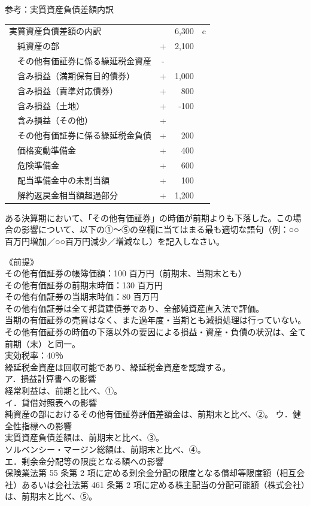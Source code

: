 \documentclass[report,gutter=10mm,fore-edge=10mm,uplatex,dvipdfmx]{jlreq}
\begin{document}
参考：実質資産負債差額内訳

\begin{tabular}{|l|lc|r|l}
\cline{1-4}
 \multicolumn{3}{|l|}{実質資産負債差額の内訳}& 6,300&c \\ \cline{2-4}
& 純資産の部 &+ & 2,100&\\ \cline{2-4}
& その他有価証券に係る繰延税金資産 &- & &\\ \cline{2-4}
&  含み損益（満期保有目的債券）&+ & 1,000&\\ \cline{2-4}
&  含み損益（責準対応債券）&+ & 800&\\ \cline{2-4}
&  含み損益（土地）&+ & -100&\\ \cline{2-4}
&  含み損益（その他）&+ & &\\ \cline{2-4}
& その他有価証券に係る繰延税金負債 &+ &200 &\\ \cline{2-4}
&価格変動準備金 &+ &400 &\\ \cline{2-4}
& 危険準備金 &+ &600 &\\ \cline{2-4}
& 配当準備金中の未割当額 &+ &100 &\\ \cline{2-4}
&解約返戻金相当額超過部分 &+ &1,200 &\\ \cline{2-4}
\end{tabular}

ある決算期において、「その他有価証券」の時価が前期よりも下落した。この場合の影響について、以下の①～⑤の空欄に当てはまる最も適切な語句（例：○○百万円増加／○○百万円減少／増減なし）を記入しなさい。

《前提》\\
その他有価証券の帳簿価額：100 百万円（前期末、当期末とも）\\
その他有価証券の前期末時価：130 百万円\\
その他有価証券の当期末時価：80 百万円\\
その他有価証券は全て邦貨建債券であり、全部純資産直入法で評価。\\
当期の有価証券の売買はなく、また過年度・当期とも減損処理は行っていない。\\
その他有価証券の時価の下落以外の要因による損益・資産・負債の状況は、全て前期（末）と同一。\\
実効税率：40％\\
繰延税金資産は回収可能であり、繰延税金資産を認識する。\\

ア．損益計算書への影響\\
経常利益は、前期と比べ、①。\\
イ．貸借対照表への影響\\
純資産の部におけるその他有価証券評価差額金は、前期末と比べ、②。
ウ．健全性指標への影響\\
実質資産負債差額は、前期末と比べ、③。\\
ソルベンシー・マージン総額は、前期末と比べ、④。\\
エ．剰余金分配等の限度となる額への影響\\
保険業法第 55 条第 2 項に定める剰余金分配の限度となる償却等限度額（相互会社）あるいは会社法第 461 条第 2 項に定める株主配当の分配可能額（株式会社）は、前期末と比べ、⑤。
\end{document}
